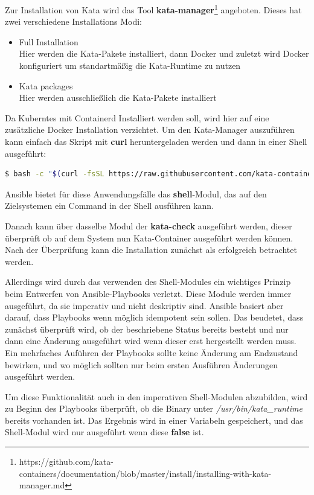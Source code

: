 Zur Installation von Kata wird das Tool \textbf{kata-manager}\footnote{https://github.com/kata-containers/documentation/blob/master/install/installing-with-kata-manager.md} angeboten. 
Dieses hat zwei verschiedene Installations Modi:
\begin{itemize}
    \item Full Installation \\ Hier werden die Kata-Pakete installiert, dann Docker und zuletzt wird Docker konfiguriert um standartmäßig die Kata-Runtime zu nutzen
    \item Kata packages \\ Hier werden ausschließlich die Kata-Pakete installiert
\end{itemize}
Da Kuberntes mit Containerd Installiert werden soll, wird hier auf eine zusätzliche Docker Installation verzichtet.
Um den Kata-Manager auszuführen kann einfach das Skript mit \textbf{curl} heruntergeladen werden und dann in einer Shell ausgeführt:
\begin{lstlisting}[language=bash]
    $ bash -c "$(curl -fsSL https://raw.githubusercontent.com/kata-containers/tests/master/cmd/kata-manager/kata-manager.sh) install-packages"
\end{lstlisting}
Ansible bietet für diese Anwendungsfälle das \textbf{shell}-Modul, das auf den Zielsystemen ein Command in der Shell ausführen kann. 

Danach kann über dasselbe Modul der \textbf{kata-check} ausgeführt werden, dieser überprüft ob auf dem System nun Kata-Container ausgeführt werden können.
Nach der Überprüfung kann die Installation zunächst als erfolgreich betrachtet werden.

Allerdings wird durch das verwenden des Shell-Modules ein wichtiges Prinzip beim Entwerfen von Ansible-Playbooks verletzt. 
Diese Module werden immer ausgeführt, da sie imperativ und nicht deskriptiv sind. 
Ansible basiert aber darauf, dass Playbooks wenn möglich idempotent sein sollen.
Das beudetet, dass zunächst überprüft wird, ob der beschriebene Status bereits besteht und nur dann eine Änderung ausgeführt wird wenn dieser erst hergestellt werden muss. \cite{ansibel_idempotency}
Ein mehrfaches Auführen der Playbooks sollte keine Änderung am Endzustand bewirken, und wo möglich sollten nur beim ersten Ausführen Änderungen ausgeführt werden. 

Um diese Funktionalität auch in den imperativen Shell-Modulen abzubilden, wird zu Beginn des Playbooks überprüft, ob die Binary unter \textit{/usr/bin/kata\_runtime} bereits vorhanden ist. 
Das Ergebnis wird in einer Variabeln gespeichert, und das Shell-Modul wird nur ausgeführt wenn diese \textbf{false} ist. 

